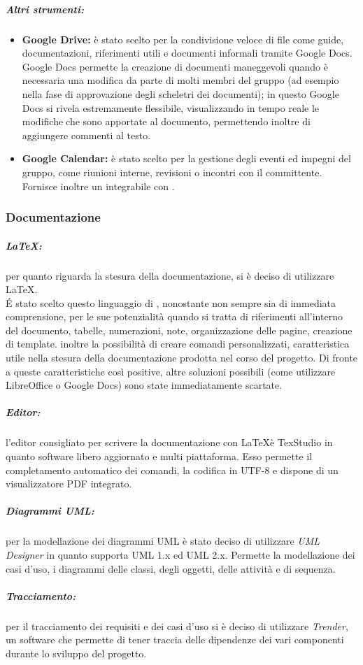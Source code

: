 \subparagraph{Altri strumenti:}
		\begin{itemize}
			\item \textbf{Google Drive:} è stato scelto per la condivisione veloce di file come guide, documentazioni, riferimenti utili e documenti informali tramite
			Google Docs. Google Docs permette la creazione di documenti
			maneggevoli quando è necessaria una modifica da parte di molti membri
			del gruppo (ad esempio nella fase di approvazione degli scheletri dei
			documenti); in questo Google Docs si rivela estremamente flessibile,
			visualizzando in tempo reale le modificheche sono apportate al documento,
			permettendo inoltre di aggiungere commenti al testo.
			\item \textbf{Google Calendar:} è stato scelto per la gestione degli eventi ed
			impegni del gruppo, come riunioni interne, revisioni o incontri con il committente. Fornisce inoltre un  integrabile con .
		\end{itemize}
	
	\subsubsection{Documentazione}
	\subparagraph{\LaTeX:} per quanto riguarda la stesura della documentazione, si è deciso di utilizzare \LaTeX. \\
		\'{E}	stato scelto questo linguaggio di , nonostante
		non sempre sia di immediata comprensione, per le sue potenzialità quando
		si tratta di riferimenti all'interno del documento, tabelle, numerazioni,
		note, organizzazione delle pagine, creazione di template. inoltre
		la possibilità di creare comandi personalizzati, caratteristica utile nella
		stesura della documentazione prodotta nel corso del progetto. Di fronte a
		queste caratteristiche così positive, altre soluzioni possibili (come utilizzare
		LibreOffice o Google Docs) sono state immediatamente scartate.
	\subparagraph{Editor:} l'editor consigliato per scrivere la documentazione con \LaTeX è
		TexStudio in quanto software libero aggiornato e multi piattaforma. Esso
		permette il completamento automatico dei comandi, la codifica in UTF-8 e
		dispone di un visualizzatore PDF integrato.
	\subparagraph{Diagrammi UML:} per la modellazione dei diagrammi UML è stato deciso di utilizzare 	\emph{UML Designer} in quanto supporta UML 1.x ed UML 2.x. Permette la modellazione dei casi d'uso, i 	diagrammi delle classi, degli oggetti, delle attività	e di sequenza.
	\subparagraph{Tracciamento:} per il tracciamento dei requisiti e dei casi d'uso si è deciso di utilizzare \emph{Trender}, un software che permette di tener traccia delle dipendenze dei vari componenti durante lo sviluppo del progetto.
	
